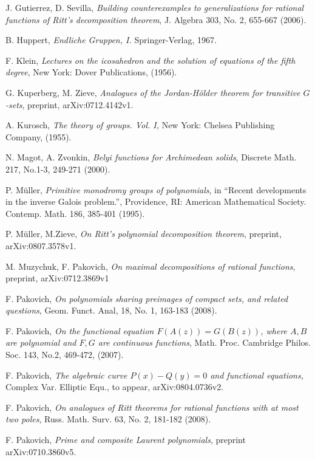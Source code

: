 \documentclass{amsart}
\begin{document}
\begin{thebibliography}{10}
 J. Gutierrez, D. Sevilla,
\textit{Building counterexamples to generalizations for rational functions of Ritt's decomposition theorem},
J. Algebra 303, No. 2, 655-667 (2006).

 B. Huppert, \textit{ Endliche Gruppen, I.} Springer-Verlag, 1967.

 F. Klein,
\textit{Lectures on the icosahedron and the solution of equations of the fifth degree},
New York: Dover Publications, (1956).

 G. Kuperberg, M. Zieve,\textit{
Analogues of the Jordan-H{\" o}lder theorem for transitive
$G$-sets}, preprint, arXiv:0712.4142v1.

 A. Kurosch, \textit{
The theory of groups. Vol. I,} New York: Chelsea Publishing Company, (1955).

 N. Magot, A. Zvonkin, \textit{
Belyi functions for Archimedean solids},
Discrete Math. 217, No.1-3, 249-271 (2000).

 P. M\"uller, \textit{Primitive monodromy groups of polynomials},
in ``Recent developments in the inverse Galois problem.'', Providence, RI: American Mathematical Society. Contemp. Math. 186, 385-401 (1995).

 P. M{\" u}ller, M.Zieve, \textit{On Ritt's polynomial decomposition theorem}, preprint, arXiv:0807.3578v1.

 M. Muzychuk, F. Pakovich, \textit{On maximal decompositions of rational functions}, preprint, arXiv:0712.3869v1

 F. Pakovich, \textit{On polynomials sharing preimages of compact sets, and related questions}, Geom. Funct. Anal, 18, No. 1, 163-183 (2008).

 F. Pakovich, \textit{On the functional equation $F(A(z))=G(B(z))$, where $A,B$ are polynomial and $F,G$ are continuous functions}, Math. Proc. Cambridge Philos. Soc. 143, No.2, 469-472,
(2007).

 F. Pakovich, \textit{The algebraic curve $P(x)-Q(y)=0$ and
functional equations,} Complex Var. Elliptic Equ., to appear, arXiv:0804.0736v2.

 F. Pakovich, {\it On analogues of Ritt theorems for rational functions with at most two poles}, Russ. Math. Surv. 63, No. 2, 181-182 (2008).

 F. Pakovich, \textit{Prime and composite Laurent polynomials}, preprint arXiv:0710.3860v5.


\end{thebibliography}
\end{document}
